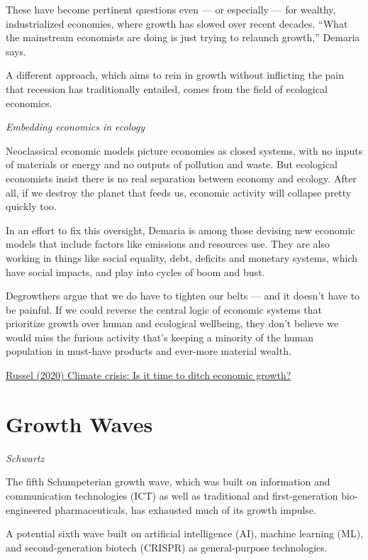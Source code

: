 \documentclass[
]{book}
\begin{document}
These have become pertinent questions even --- or especially --- for wealthy, industrialized economies, where growth has slowed over recent decades. ``What the mainstream economists are doing is just trying to relaunch growth,'' Demaria says.

A different approach, which aims to rein in growth without inflicting the pain that recession has traditionally entailed, comes from the field of ecological economics.

\emph{Embedding economics in ecology}

Neoclassical economic models picture economies as closed systems, with no inputs of materials or energy and no outputs of pollution and waste. But ecological economists insist there is no real separation between economy and ecology. After all, if we destroy the planet that feeds us, economic activity will collapse pretty quickly too.

In an effort to fix this oversight, Demaria is among those devising new economic models that include factors like emissions and resources use. They are also working in things like social equality, debt, deficits and monetary systems, which have social impacts, and play into cycles of boom and bust.

Degrowthers argue that we do have to tighten our belts --- and it doesn't have to be painful. If we could reverse the central logic of economic systems that prioritize growth over human and ecological wellbeing, they don't believe we would miss the furious activity that's keeping a minority of the human population in must-have products and ever-more material wealth.

\href{https://www.dw.com/en/climatechange-emissions-fossilfuels-gdp-economy-renewables/a-55089013}{Russel (2020) Climate crisis: Is it time to ditch economic growth?}

\hypertarget{growth-waves}{%
\section{Growth Waves}\label{growth-waves}}

\emph{Schwartz}

The fifth Schumpeterian growth wave, which was built on information and communication technologies (ICT) as well as traditional and first-generation bio-engineered pharmaceuticals, has exhausted much of its growth impulse.

A potential sixth wave built on artificial intelligence (AI), machine learning (ML), and second-generation biotech (CRISPR) as general-purpose technologies.
\end{document}
